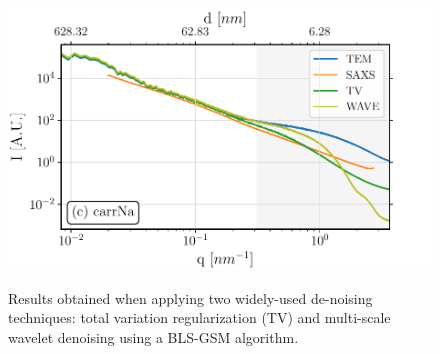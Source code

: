 \begin{figure}[!ht]
\begin{minipage}{0.32\textwidth}
    \includegraphics[width=\linewidth]{Figures/chapter-temsaxs/saxs-tem-TV-carNa.pdf}\label{fig:denoise_carrNa}
  \end{minipage}
  \caption{
    Results obtained when applying two widely-used de-noising techniques: total variation regularization (TV) and multi-scale wavelet denoising using a BLS-GSM algorithm.}
\label{fig:fig3}
\end{figure}

